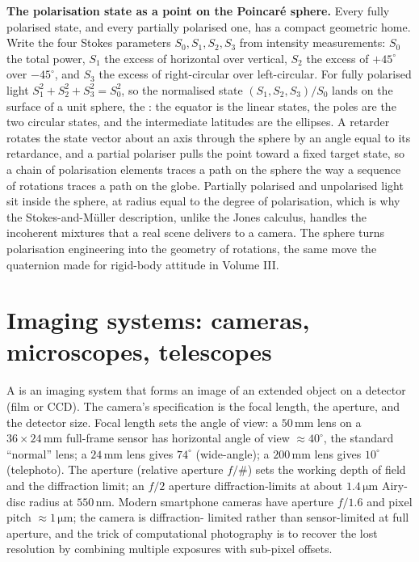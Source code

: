 \begin{mastery}
\textbf{The polarisation state as a point on the Poincar\'e sphere.} Every fully
polarised state, and every partially polarised one, has a compact geometric
home. Write the four Stokes parameters $S_0, S_1, S_2, S_3$ from intensity
measurements: $S_0$ the total power, $S_1$ the excess of horizontal over
vertical, $S_2$ the excess of $+45^{\circ}$ over $-45^{\circ}$, and $S_3$ the
excess of right-circular over left-circular. For fully polarised light
$S_1^2 + S_2^2 + S_3^2 = S_0^2$, so the normalised state $(S_1, S_2, S_3)/S_0$
lands on the surface of a unit sphere, the : the
equator is the linear states, the poles are the two circular states, and the
intermediate latitudes are the ellipses. A retarder rotates the state vector
about an axis through the sphere by an angle equal to its retardance, and a
partial polariser pulls the point toward a fixed target state, so a chain of
polarisation elements traces a path on the sphere the way a sequence of
rotations traces a path on the globe. Partially polarised and unpolarised light
sit inside the sphere, at radius equal to the degree of polarisation, which is
why the Stokes-and-M\"uller description, unlike the Jones calculus, handles the
incoherent mixtures that a real scene delivers to a camera. The sphere turns
polarisation engineering into the geometry of rotations, the same move the
quaternion made for rigid-body attitude in Volume III.
\end{mastery}

\section{Imaging systems: cameras, microscopes, telescopes}

A  is an imaging system that forms an image of an
extended object on a detector (film or CCD). The camera's specification
is the focal length, the aperture, and the detector size. Focal length
sets the angle of view: a $50\,\si{\milli\meter}$ lens on a
$36\times 24\,\si{\milli\meter}$ full-frame sensor has horizontal
angle of view $\approx 40^{\circ}$, the standard ``normal'' lens; a
$24\,\si{\milli\meter}$ lens gives $74^{\circ}$ (wide-angle); a
$200\,\si{\milli\meter}$ lens gives $10^{\circ}$ (telephoto). The
aperture (relative aperture $f/\#$) sets the working depth of field
and the diffraction limit; an $f/2$ aperture diffraction-limits at
about $1.4\,\si{\micro\meter}$ Airy-disc radius at $550\,\si{\nano
\meter}$. Modern smartphone cameras have aperture $f/1.6$ and pixel
pitch $\approx 1\,\si{\micro\meter}$; the camera is diffraction-
limited rather than sensor-limited at full aperture, and the trick
of computational photography is to recover the lost resolution by
combining multiple exposures with sub-pixel offsets.

